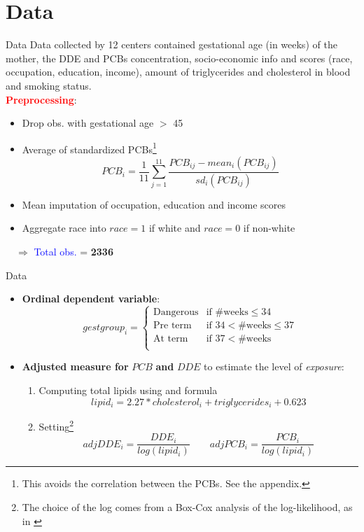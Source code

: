 \documentclass{beamer}
\begin{document}
\section{Data}
\begin{frame}{Data}
Data collected by 12 centers contained gestational age (in weeks) of the mother, the DDE and PCBs concentration, socio-economic info and scores (race, occupation, education, income), amount of triglycerides and cholesterol in blood and smoking status. \\
\medskip 
\textcolor{red}{\textbf{Preprocessing}}:
\begin{itemize}
	\item Drop obs. with gestational age $>$ 45 
	\item Average of standardized PCBs\footnote{This avoids the correlation between the PCBs. See the appendix.}
	$$PCB_i = \frac{1}{11}\sum_{j=1}^{11} \frac{PCB_{ij} - mean_i(PCB_{ij})}{sd_i(PCB_{ij})}$$
	\item Mean imputation of occupation, education and income scores 
	\item Aggregate race into $race = 1$ if white and $race=0$ if non-white
\end{itemize}
$\quad \Longrightarrow$ \textcolor{blue}{Total obs.} = \textbf{2336}
\end{frame}


\begin{frame}{Data}
\small
\begin{itemize}
	\item \textbf{Ordinal dependent variable}:
	$$gestgroup_i = 
	\begin{cases}
	\textrm{Dangerous} & \text{if } \text{\#weeks} \leq 34 \\
	\textrm{Pre term } & \text{if }  34 < \text{\#weeks} \leq 37 \\
	\textrm{At term  } & \text{if }  37 < \text{\#weeks} \\
	\end{cases}$$
	\item \textbf{Adjusted measure for} $PCB$ \textbf{and} $DDE$ to estimate the level of \textit{exposure}:
	\begin{enumerate}
		\item Computing total lipids using \cite{Phillips1989} and \cite{Bernert2007} formula $$lipid_i =  2.27 * cholesterol_i + triglycerides_i + 0.623$$ 
		\item Setting\footnote{The choice of the log comes from a Box-Cox analysis of the log-likelihood, as in \cite{Li_Long_Duns}}
		$$adjDDE_i = \frac{DDE_i}{log(lipid_i)} \qquad adjPCB_i = \frac{PCB_i}{log(lipid_i)}$$
	\end{enumerate}
\end{itemize}
\end{frame}
\end{document}
